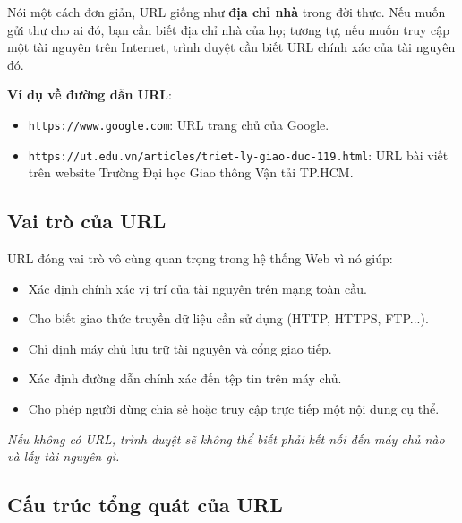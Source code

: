 \documentclass[11pt,oneside]{book}
\newcommand{\codeinline}[1]{\textcolor{accentOrange}{\texttt{#1}}}
\begin{document}
\begin{tipBox}
Nói một cách đơn giản, URL giống như \textbf{địa chỉ nhà} trong đời thực. Nếu muốn gửi thư cho ai đó, bạn cần biết địa chỉ nhà của họ; tương tự, nếu muốn truy cập một tài nguyên trên Internet, trình duyệt cần biết URL chính xác của tài nguyên đó.
\end{tipBox}

\textbf{Ví dụ về đường dẫn URL}:
\begin{itemize}[leftmargin=1.8em, itemsep=2pt, parsep=0pt]
    \item \codeinline{https://www.google.com}: URL trang chủ của Google.
    \item \codeinline{https://ut.edu.vn/articles/triet-ly-giao-duc-119.html}: URL bài viết trên website Trường Đại học Giao thông Vận tải TP.HCM.
\end{itemize}

\subsection{Vai trò của URL}

URL đóng vai trò vô cùng quan trọng trong hệ thống Web vì nó giúp:
\begin{itemize}[leftmargin=1.8em, itemsep=2pt, parsep=0pt]
    \item Xác định chính xác vị trí của tài nguyên trên mạng toàn cầu.
    \item Cho biết giao thức truyền dữ liệu cần sử dụng (HTTP, HTTPS, FTP...).
    \item Chỉ định máy chủ lưu trữ tài nguyên và cổng giao tiếp.
    \item Xác định đường dẫn chính xác đến tệp tin trên máy chủ.
    \item Cho phép người dùng chia sẻ hoặc truy cập trực tiếp một nội dung cụ thể.
\end{itemize}
\textit{Nếu không có URL, trình duyệt sẽ không thể biết phải kết nối đến máy chủ nào và lấy tài nguyên gì.}

\subsection{Cấu trúc tổng quát của URL}
\end{document}
